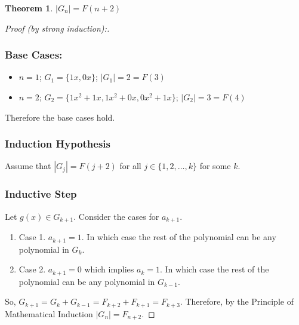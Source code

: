 \documentclass{article}
\newtheorem{theorem}{Theorem}[section]
\begin{document}
    \begin{theorem}
        $|G_n| = F(n+2)$
    \end{theorem}
    \begin{proof}[Proof (by strong induction):]
            \subsubsection*{Base Cases:}
            \begin{itemize}
                \item $n=1$; $G_1 =\{1x, 0x\}$; $|G_1|= 2 = F(3)$
                \item $n=2$; $G_2 =\{1x^2 + 1x, 1x^2 + 0x, 0x^2 + 1x \}$; $|G_2|= 3 = F(4)$
            \end{itemize}
            Therefore the base cases hold.
            \subsubsection*{Induction Hypothesis}
                Assume that $|G_j| = F(j+2)$ for all $j \in \{1, 2, \ldots, k\}$ for some $k$.
            \subsubsection*{Inductive Step}
                Let $g(x) \in G_{k+1}$. Consider the cases for $a_{k+1}$.
                \begin{enumerate}
                    \item Case 1. $a_{k+1} = 1$. In which case the rest of the polynomial can be any polynomial in $G_k$.
                    \item Case 2. $a_{k+1} = 0$ which implies $a_k = 1$. In which case the rest of the polynomial can be any polynomial in $G_{k-1}$.
                \end{enumerate}
                So, $G_{k+1} = G_k + G_{k-1} = F_{k+2} + F_{k+1} = F_{k+3}$. Therefore, by the Principle of Mathematical Induction $|G_n| = F_{n+2}$.
    \end{proof}
\end{document}
